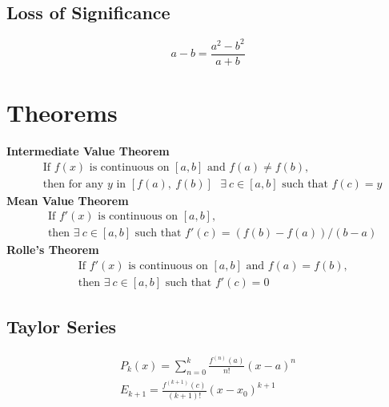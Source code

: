 \documentclass[10pt]{article}
\begin{document}
\begin{multicols}{2}
\begin{minipage}{\columnwidth}
        \subsection*{Loss of Significance}
        \begin{equation*}
            a - b = \frac{a^2-b^2}{a+b}
        \end{equation*}
        \section*{Theorems}
        \textbf{Intermediate Value Theorem}
        \begin{equation*}
            \begin{aligned}
                & \text{If } f(x) \text{ is continuous on } [a,b] \text{ and } f(a) \neq f(b) \text{,} \\
                & \text{then for any \(y\) in \([f(a),\ f(b)] \) } \exists\ c \in [a,b] \text{ such that } f(c) = y
            \end{aligned}
        \end{equation*}
        \textbf{Mean Value Theorem}
        \begin{equation*}
            \begin{aligned}
                & \text{If } f'(x) \text{ is continuous on } [a,b] \text{,} \\
                & \text{then } \exists\ c \in [a,b] \text{ such that } f'(c) = (f(b)-f(a))/(b-a)
            \end{aligned}
        \end{equation*}
        \textbf{Rolle's Theorem}
        \begin{equation*}
            \begin{aligned}
                & \text{If } f'(x) \text{ is continuous on } [a,b] \text{ and } f(a) = f(b) \text{,} \\
                & \text{then } \exists\ c \in [a,b] \text{ such that } f'(c) = 0
            \end{aligned}
        \end{equation*}
        \subsection*{Taylor Series}
        \begin{align*}
            P_k(x) = \sum_{n=0}^k \frac{f^{(n)}(a)}{n!} (x-a)^n \\
            E_{k+1} = \frac{f^{(k+1)}(c)}{(k + 1)!}  (x-x_0) ^ {k+1}
        \end{align*}
    \end{minipage}
    \begin{minipage}{\columnwidth}
        \begin{flushright}

\end{flushright}
\end{minipage}
\end{multicols}
\end{document}
